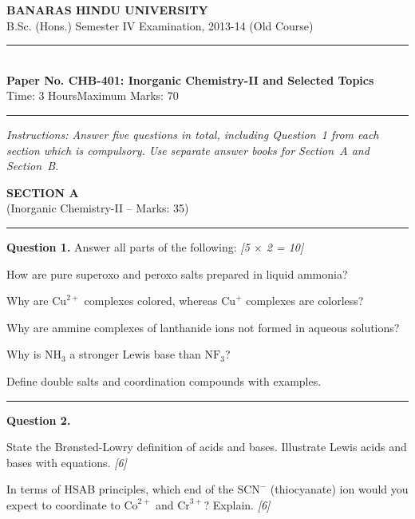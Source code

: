 \documentclass[11pt,a4paper]{article}
\newcommand{\pts}[1]{\hfill   \textit{[#1]}}
\begin{document}
\begin{center}
  {\large\bfseries BANARAS HINDU UNIVERSITY}\\[2pt]
  {\normalsize B.Sc. (Hons.) Semester IV Examination, 2013-14 (Old Course)}\\[6pt]
  \rule{0.8\linewidth}{0.5pt}\\[6pt]
  {\large\bfseries Paper No. CHB-401: Inorganic Chemistry-II and Selected Topics}\\[4pt]
  {\normalsize Time: 3 Hours\hfill Maximum Marks: 70}
\end{center}
\rule{\linewidth}{0.4pt}
\small



\noindent   \textit{Instructions: Answer five questions in total, including Question~1 from each section which is compulsory. Use separate answer books for Section~A and Section~B.}

\normalsize
\bigskip


\begin{center}
  {\large\bfseries SECTION A}\\[2pt]
  {\normalsize (Inorganic Chemistry-II -- Marks: 35)}
\end{center}
\rule{0.4\linewidth}{0.2pt}
\smallskip




\noindent   \textbf{Question 1.} Answer all parts of the following: \pts{5 $ \times$ 2 = 10}

\begin{parts}
  \item How are pure superoxo and peroxo salts prepared in liquid ammonia?
  \item Why are $ \text{Cu}^{2+}$ complexes colored, whereas $ \text{Cu}^+$ complexes are colorless?
  \item Why are ammine complexes of lanthanide ions not formed in aqueous solutions?
  \item Why is $ \text{NH}_3$ a stronger Lewis base than $ \text{NF}_3$?
  \item Define double salts and coordination compounds with examples.
\end{parts}

\medskip\rule{\linewidth}{0.2pt}




\noindent   \textbf{Question 2.}

\begin{parts}
  \item State the Br\o nsted-Lowry definition of acids and bases. Illustrate Lewis acids and bases with equations. \pts{6}
  \item In terms of HSAB principles, which end of the $ \text{SCN}^-$ (thiocyanate) ion would you expect to coordinate to $ \text{Co}^{2+}$ and $ \text{Cr}^{3+}$? Explain. \pts{6}
\end{parts}
\end{document}

